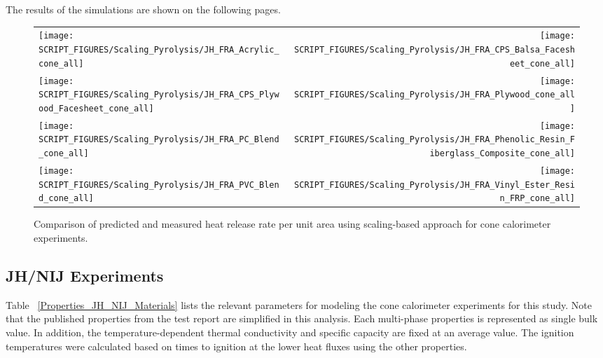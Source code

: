 The results of the simulations are shown on the following pages.

\begin{figure}[p]
\begin{tabular*}{\textwidth}{l@{\extracolsep{\fill}}r}
\texttt{[image: SCRIPT\_FIGURES/Scaling\_Pyrolysis/JH\_FRA\_Acrylic\_cone\_all]} &
\texttt{[image: SCRIPT\_FIGURES/Scaling\_Pyrolysis/JH\_FRA\_CPS\_Balsa\_Facesheet\_cone\_all]} \\
\texttt{[image: SCRIPT\_FIGURES/Scaling\_Pyrolysis/JH\_FRA\_CPS\_Plywood\_Facesheet\_cone\_all]} &
\texttt{[image: SCRIPT\_FIGURES/Scaling\_Pyrolysis/JH\_FRA\_Plywood\_cone\_all]} \\
\texttt{[image: SCRIPT\_FIGURES/Scaling\_Pyrolysis/JH\_FRA\_PC\_Blend\_cone\_all]} &
\texttt{[image: SCRIPT\_FIGURES/Scaling\_Pyrolysis/JH\_FRA\_Phenolic\_Resin\_Fiberglass\_Composite\_cone\_all]} \\
\texttt{[image: SCRIPT\_FIGURES/Scaling\_Pyrolysis/JH\_FRA\_PVC\_Blend\_cone\_all]} &
\texttt{[image: SCRIPT\_FIGURES/Scaling\_Pyrolysis/JH\_FRA\_Vinyl\_Ester\_Resin\_FRP\_cone\_all]} \\
\end{tabular*}
\caption[Heat release rate per unit area of JH/FRA materials using scaling model]
{Comparison of predicted and measured heat release rate per unit area using scaling-based approach for cone calorimeter experiments.}
\label{JH_FRA_HRR_materials}
\end{figure}

\clearpage

\subsection{JH/NIJ Experiments}\label{sec_JH_NIJ_Materials}

Table ~\ref{Properties_JH_NIJ_Materials} lists the relevant parameters for modeling the cone calorimeter experiments for this study.
Note that the published properties from the test report are simplified in this analysis. Each multi-phase properties is represented as single bulk value. 
In addition, the temperature-dependent thermal conductivity and specific capacity are fixed at an average value. 
The ignition temperatures were calculated based on times to ignition at the lower heat fluxes using the other properties.

